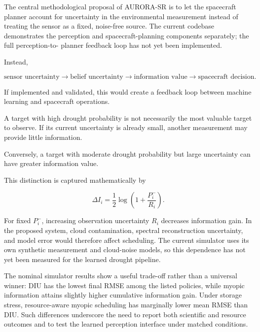 \documentclass[11pt,a4paper]{article}
\begin{document}
The central methodological proposal of AURORA-SR is to let the
spacecraft planner account for uncertainty in the environmental
measurement instead of treating the sensor as a fixed, noise-free
source. The current codebase demonstrates the perception and
spacecraft-planning components separately; the full perception-to-
planner feedback loop has not yet been implemented.

Instead,

\begin{equation}
\boxed{
\text{sensor uncertainty}
\rightarrow
\text{belief uncertainty}
\rightarrow
\text{information value}
\rightarrow
\text{spacecraft decision}.
}
\end{equation}

If implemented and validated, this would create a feedback loop
between machine learning and spacecraft operations.

A target with high drought probability is not necessarily the most
valuable target to observe. If its current uncertainty is already
small, another measurement may provide little information.

Conversely, a target with moderate drought probability but large
uncertainty can have greater information value.

This distinction is captured mathematically by

\begin{equation}
\Delta I_i
=
\frac12
\log
\left(
1+
\frac{P_i^-}{R_i}
\right).
\end{equation}

For fixed $P_i^-$, increasing observation uncertainty $R_i$ decreases
information gain. In the proposed system, cloud contamination,
spectral reconstruction uncertainty, and model error would therefore
affect scheduling. The current simulator uses its own synthetic
measurement and cloud-noise models, so this dependence has not yet
been measured for the learned drought pipeline.

The nominal simulator results show a useful trade-off rather than a
universal winner: DIU has the lowest final RMSE among the listed
policies, while myopic information attains slightly higher cumulative
information gain. Under storage stress, resource-aware myopic
scheduling has marginally lower mean RMSE than DIU. Such differences
underscore the need to report both scientific and resource outcomes
and to test the learned perception interface under matched conditions.

\end{document}
